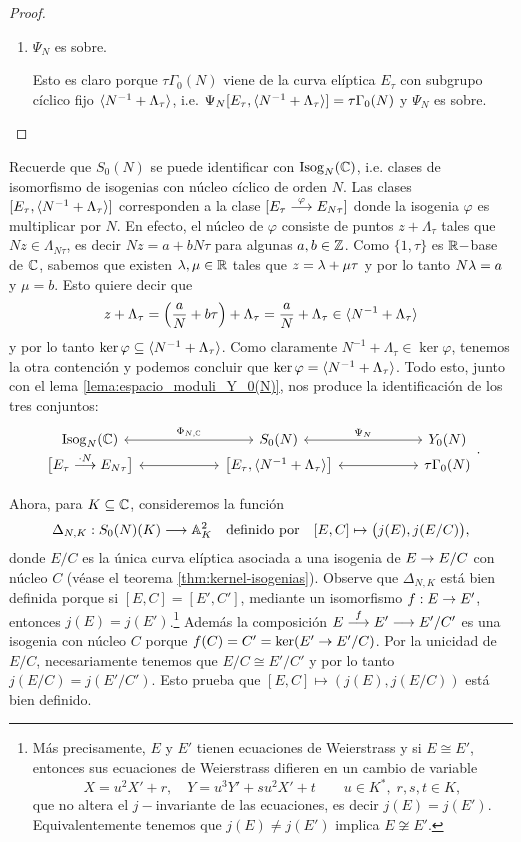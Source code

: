 \begin{proof}
\begin{enumerate}[label=\emph{\roman*})]
  \item $\Psi_N$ es sobre.
  
  \-\;\; Esto es claro porque $\tau\Gamma_0(N)$ viene de la curva elíptica $E_\tau$ con subgrupo cíclico fijo $\langle N^{-1}+\Lambda_\tau \rangle$, i.e. $\Psi_N[E_\tau,\langle N^{-1}+\Lambda_\tau \rangle]=\tau\Gamma_0(N)$ y $\Psi_N$ es sobre.
\end{enumerate}
\end{proof}

\begin{nota}
	Recuerde que $S_0(N)$ se puede identificar con $\mathrm{Isog}_N(\mathbb{C})$, i.e. clases de isomorfismo de isogenias con núcleo cíclico de orden $N$. Las clases $[E_\tau,\langle N^{-1}+\Lambda_\tau \rangle]$ corresponden a la clase $[E_\tau\overset{\varphi}{\longrightarrow} E_{N\tau}]$ donde la isogenia $\varphi$ es multiplicar por $N$. En efecto, el núcleo de $\varphi$ consiste de puntos $z+\Lambda_\tau$ tales que $Nz\in\Lambda_{N\tau}$, es decir $Nz=a+bN\tau$ para algunas $a,b\in\mathbb{Z}$. Como $\{1,\tau\}$ es $\mathbb{R}-$base de $\mathbb{C}$, sabemos que existen $\lambda,\mu\in\mathbb{R}$ tales que $z=\lambda+\mu\tau$ y por lo tanto $N\lambda=a$ y $\mu=b$. Esto quiere decir que 
	\[
	z+\Lambda_\tau=\left(\frac{a}{N}+b\tau\right)+\Lambda_\tau=\frac{a}{N}+\Lambda_\tau\in\langle N^{-1}+\Lambda_\tau \rangle
	\]
y por lo tanto $\ker\varphi\subseteq\langle N^{-1}+\Lambda_\tau \rangle$. Como claramente $N^{-1}+\Lambda_\tau\in\ker\varphi$, tenemos la otra contención y podemos concluir que $\ker\varphi=\langle N^{-1}+\Lambda_\tau \rangle$. Todo esto, junto con el lema \ref{lema:espacio_moduli_Y_0(N)}, nos produce la identificación de los tres conjuntos:
\[
	\begin{tikzcd}[row sep=-1mm,column sep=20mm]
		\mathrm{Isog}_N(\CC) \arrow[r, leftrightarrow,"\Phi_{N,\CC}"] & S_0(N) \arrow[r,leftrightarrow,"\Psi_N"] & Y_0(N) \\
		\big[E_{\tau}\morf{\cdot N} E_{N\tau}\big] \arrow[r,leftrightarrow] & \big[E_\tau,\gen{N^{-1}+\Lambda_\tau}\big] \arrow[r,leftrightarrow] & \tau\Gamma_0(N)
	\end{tikzcd}.
\]
\end{nota}


	Ahora, para $K\subseteq\mathbb{C}$, consideremos la función
	\[
		\Delta_{N,K}:S_0(N)(K)\longrightarrow\mathbb{A}^2_K \quad\text{definido por}\quad [E,C]\mapsto \big(j(E),j(E/C)\big),
	\]
donde $E/C$ es la única curva elíptica asociada a una isogenia de $E\rightarrow E/C$ con núcleo $C$ (véase el teorema \ref{thm:kernel-isogenias}). Observe que $\Delta_{N,K}$ está bien definida porque si $[E,C]=[E',C']$, mediante un isomorfismo $f:E\rightarrow E'$, entonces $j(E)=j(E')$.\footnote{\label{footnote-j-inv}Más precisamente, $E$ y $E'$ tienen ecuaciones de Weierstrass y si $E\cong E'$, entonces sus ecuaciones de Weierstrass difieren en un cambio de variable
\[
	X=u^2X'+r,\quad Y=u^3Y'+su^2X'+t \qquad u\in K^*,\; r,s,t\in K,
\]
que no altera el $j-$invariante de las ecuaciones, es decir $j(E)=j(E')$. Equivalentemente tenemos que $j(E)\neq j(E')$ implica $E\not\cong E'$.} Además la composición $E\overset{f}{\longrightarrow}E'\longrightarrow E'/C'$ es una isogenia con núcleo $C$ porque $f(C)=C'=\ker(E'\rightarrow E'/C)$. Por la unicidad de $E/C$, necesariamente tenemos que $E/C\cong E'/C'$ y por lo tanto $j(E/C)=j(E'/C')$. Esto prueba que $[E,C]\mapsto(j(E),j(E/C))$ está bien definido.

